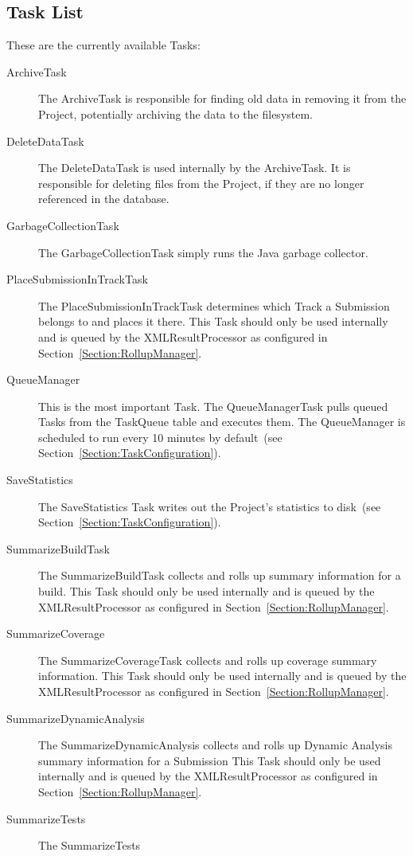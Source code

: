 \documentclass{InsightBook}
\begin{document}
\subsection{Task List}
These are the currently available Tasks:
\begin{description}
  \item[ArchiveTask] The ArchiveTask is responsible for finding old
  data in removing it from the Project, potentially archiving the data
  to the filesystem.
  \item[DeleteDataTask] The DeleteDataTask is used internally by the
  ArchiveTask.  It is responsible for deleting files from the Project,
  if they are no longer referenced in the database.
  \item[GarbageCollectionTask] The GarbageCollectionTask simply runs
  the Java garbage collector.
  \item[PlaceSubmissionInTrackTask] The PlaceSubmissionInTrackTask
  determines which Track a Submission belongs to and places it there.
  This Task should only be used internally and is queued by the
  XMLResultProcessor as configured in Section~\ref{Section:RollupManager}.
  \item[QueueManager] This is the most important Task.  The
  QueueManagerTask pulls queued Tasks from the TaskQueue table and
  executes them.  The QueueManager is scheduled to run every 10
  minutes by default~(see Section~\ref{Section:TaskConfiguration}).
  \item[SaveStatistics] The SaveStatistics Task writes out the
  Project's statistics to disk~(see Section~\ref{Section:TaskConfiguration}).
  \item[SummarizeBuildTask] The SummarizeBuildTask
  collects and rolls up summary information for a build.
  This Task should only be used internally and is queued by the
  XMLResultProcessor as configured in Section~\ref{Section:RollupManager}.
  \item[SummarizeCoverage] The SummarizeCoverageTask
  collects and rolls up coverage summary information.
  This Task should only be used internally and is queued by the
  XMLResultProcessor as configured in Section~\ref{Section:RollupManager}.
  \item[SummarizeDynamicAnalysis] The SummarizeDynamicAnalysis
  collects and rolls up Dynamic Analysis summary information for a Submission
  This Task should only be used internally and is queued by the
  XMLResultProcessor as configured in Section~\ref{Section:RollupManager}.
  \item[SummarizeTests] The SummarizeTests

\end{description}
\end{document}
